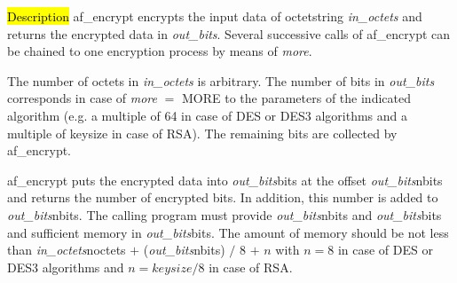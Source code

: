 



\hl{Description}
af\_encrypt encrypts the input data of octetstring {\em in\_octets} and returns the encrypted data
in {\em out\_bits}. Several successive calls of af\_encrypt can be chained
to one encryption process by means of {\em more}.

The number of octets in {\em in\_octets} is arbitrary. The number of bits in {\em out\_bits}
corresponds in case of {\em more} $=$ MORE to the parameters of the indicated algorithm
(e.g. a multiple of 64 in case of DES or DES3 algorithms and a multiple of keysize
in case of RSA). The remaining bits are collected by af\_encrypt.

af\_encrypt puts the encrypted data into {\em out\_bits}\pf bits at the offset
{\em out\_bits}\pf nbits and returns the number of encrypted bits. In addition, this number is added 
to {\em out\_bits}\pf nbits.
The calling program must provide {\em out\_bits}\pf nbits and {\em out\_bits}\pf bits and sufficient
memory in {\em out\_bits}\pf bits.
The amount of memory should be not less than
{\em in\_octets}\pf noctets $+$ ({\em out\_bits}\pf nbits) $/$ 8 $+$ $n$ with $n = 8$ 
in case of DES or DES3 algorithms and $n = keysize / 8$ in case of RSA.

